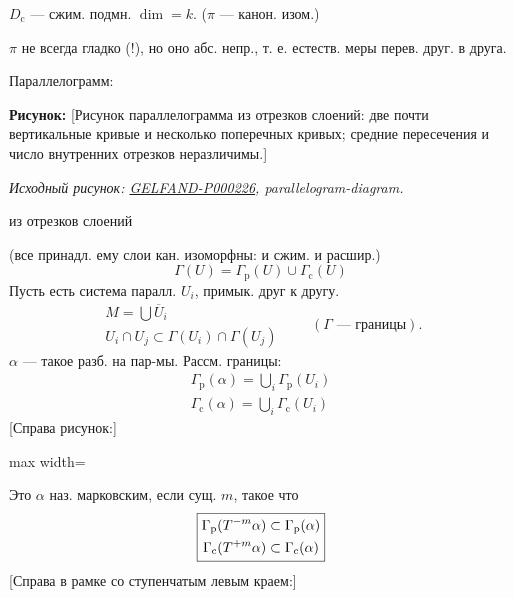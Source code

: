 \documentclass[11pt]{article}
\theoremstyle{definition}
\theoremstyle{remark}
\newcommand{\SourceFigure}[3]{%
  \par\begingroup\color{blue!60!black}\textbf{\hyperref[#1:source-page]{Source figure #1/#2}:} #3%
  \par\textit{Consult the authoritative scan at this locator.}\endgroup\par%
}
\renewcommand{\SourceFigure}[3]{%
  \par\begingroup\color{blue!55!black}\textbf{Рисунок:} #3%
  \par{\small\textit{Исходный рисунок: \hyperref[#1:source-page]{#1}, #2.}}%
  \endgroup\par%
}
\begin{document}
$D_{\mathrm{c}}$ — сжим. подмн. $\dim=k$.
\quad($\pi$ — канон. изом.)

$\pi$ не всегда гладко (!), но оно абс. непр., т. е. естеств.
меры перев. друг. в друга.

Параллелограмм: \SourceFigure{GELFAND-P000226}{parallelogram-diagram}{[Рисунок параллелограмма из отрезков слоений: две почти вертикальные кривые и несколько поперечных кривых; средние пересечения и число внутренних отрезков неразличимы.]} из отрезков слоений

(все принадл. ему слои кан. изоморфны: и сжим. и расшир.)
\begin{equation*}
 \Gamma(U)=\Gamma_{\mathrm{p}}(U)\cup\Gamma_{\mathrm{c}}(U)
\end{equation*}
Пусть есть система паралл. $U_i$, примык. друг к другу.
\begin{equation*}
 \begin{gathered}
 M=\bigcup\overline{U}_i\\
 U_i\cap U_j\subset\Gamma(U_i)\cap\Gamma(U_j)
 \end{gathered}
 \qquad(\Gamma\text{ — границы}).
\end{equation*}
$\alpha$ — такое разб. на пар-мы. Рассм. границы:
\begin{equation*}
 \begin{gathered}
 \Gamma_{\mathrm{p}}(\alpha)=\bigcup_i\Gamma_{\mathrm{p}}(U_i)\\
 \Gamma_{\mathrm{c}}(\alpha)=\bigcup_i\Gamma_{\mathrm{c}}(U_i)
 \end{gathered}
\end{equation*}
[Справа рисунок:]
\begin{center}
\begin{adjustbox}{max width=\linewidth}
\end{adjustbox}
\end{center}
Это $\alpha$ наз. марковским, если сущ. $m$, такое что
\begin{equation*}
 \fbox{$\begin{gathered}
 \Gamma_{\mathrm{p}}(T^{-m}\alpha)\subset\Gamma_{\mathrm{p}}(\alpha)\\
 \Gamma_{\mathrm{c}}(T^{+m}\alpha)\subset\Gamma_{\mathrm{c}}(\alpha)
 \end{gathered}$}
\end{equation*}
[Справа в рамке со ступенчатым левым краем:]
\end{document}
